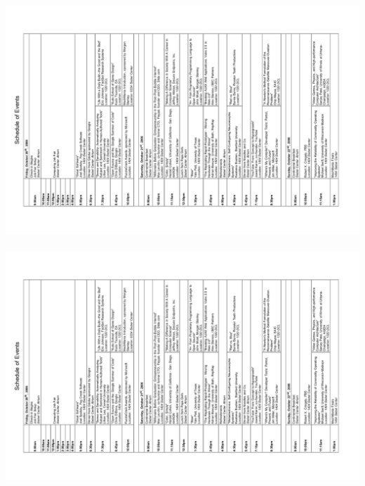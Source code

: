 \documentclass{article}
\begin{document}
\begin{centering}
\noindent
~~~~~~\includegraphics{rp06-schedule-small.pdf}\\
~~~~~~\includegraphics{rp06-schedule-small.pdf}

\end{centering}
\end{document}
